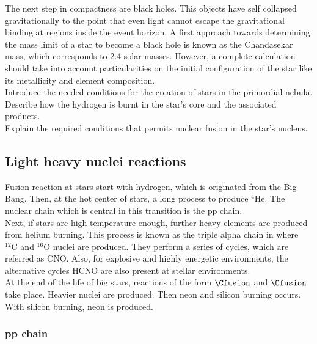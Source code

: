 \documentclass[openany]{book}
\begin{document}
The next step in compactness are black holes. This objects have self collapsed gravitationally to the point that even light cannot escape the gravitational binding at regions inside the event horizon. A first approach towards determining the mass limit of a star to become a black hole is known as the Chandasekar mass, which corresponds to 2.4 solar masses. However, a complete calculation should take into account particularities on the initial configuration of the star like its metallicity and element composition.  \\

Introduce the needed conditions for the creation of stars in the primordial nebula.\\

Describe how the hydrogen is burnt in the star's core and the associated products.  \\


Explain the required conditions that permits nuclear fusion in the star's nucleus.

\subsection{Light heavy nuclei reactions} \label{sub:lightReactions}

Fusion reaction at stars start with hydrogen, which is originated from the Big Bang. Then, at the hot center of stars, a long process to produce $\mathrm{{}^{4}He}$. The nuclear chain which is central in this transition is the pp chain. \\

Next, if stars are high temperature enough, further heavy elements are produced from helium burning. This process is known as the triple alpha chain in where $\mathrm{{}^{12}C}$ and $\mathrm{{}^{16}O}$  nuclei are produced. They perform a series of cycles, which are referred as CNO. Also, for explosive and highly energetic environments, the alternative cycles HCNO are also present at stellar environments.  \\

At the end of the life of big stars, reactions of the form $\Cfusion$ and $\Ofusion$ take place. Heavier nuclei are produced. Then neon and silicon burning occurs. With silicon burning, neon is produced. 

\subsubsection{pp chain}
\end{document}
